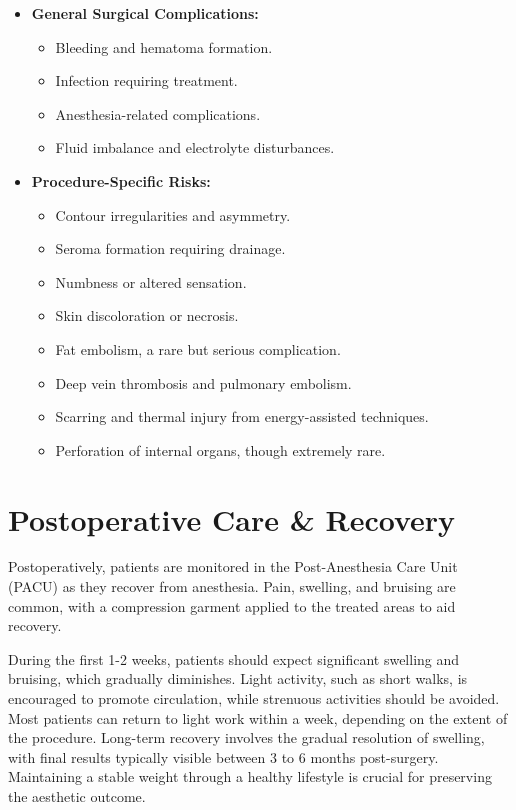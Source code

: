 \begin{itemize}
  \item \textbf{General Surgical Complications:}
    \begin{itemize}
      \item Bleeding and hematoma formation.
      \item Infection requiring treatment.
      \item Anesthesia-related complications.
      \item Fluid imbalance and electrolyte disturbances.
    \end{itemize}
  
  \item \textbf{Procedure-Specific Risks:}
    \begin{itemize}
      \item Contour irregularities and asymmetry.
      \item Seroma formation requiring drainage.
      \item Numbness or altered sensation.
      \item Skin discoloration or necrosis.
      \item Fat embolism, a rare but serious complication.
      \item Deep vein thrombosis and pulmonary embolism.
      \item Scarring and thermal injury from energy-assisted techniques.
      \item Perforation of internal organs, though extremely rare.
    \end{itemize}
\end{itemize}

\section*{Postoperative Care \& Recovery}
Postoperatively, patients are monitored in the Post-Anesthesia Care Unit (PACU) as they recover from anesthesia. Pain, swelling, and bruising are common, with a compression garment applied to the treated areas to aid recovery. 

During the first 1-2 weeks, patients should expect significant swelling and bruising, which gradually diminishes. Light activity, such as short walks, is encouraged to promote circulation, while strenuous activities should be avoided. Most patients can return to light work within a week, depending on the extent of the procedure. Long-term recovery involves the gradual resolution of swelling, with final results typically visible between 3 to 6 months post-surgery. Maintaining a stable weight through a healthy lifestyle is crucial for preserving the aesthetic outcome.

